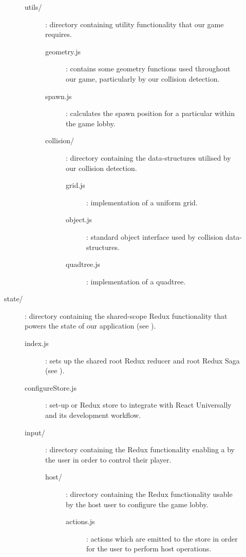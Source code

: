 \documentclass{standalone}
\begin{document}
\begin{formal}
\begin{description}
\begin{description}
\begin{description}
			      		\item[utils/]: directory containing utility functionality that our game requires.
				      	\begin{description}
			      			\item[geometry.js]: contains some geometry functions used throughout our game, particularly by our collision detection.
			      			\item[spawn.js]: calculates the spawn position for a particular within the game lobby.

			      			\item[collision/]: directory containing the data-structures utilised by our collision detection.
				      		\begin{description}
				      			\item[grid.js]: implementation of a uniform grid.
				      			\item[object.js]: standard object interface used by collision data-structures.
				      			\item[quadtree.js]: implementation of a quadtree.
				    			\end{description}
			      		\end{description}
					    \end{description}

					    \item[state/]: directory containing the shared-scope Redux functionality that powers the state of our application (see ).
					    	\begin{description}
			      			\item[index.js]: sets up the shared root Redux reducer and root Redux Saga (see ).
			      			\item[configureStore.js]: set-up or Redux store to integrate with React Universally and its development workflow.

			      			\item[input/]: directory containing the Redux functionality enabling a by the user in order to control their player.
					    		\begin{description}
				      			\item[host/]: directory containing the Redux functionality usable by the host user to configure the game lobby.
						    		\begin{description}
				      				\item[actions.js]: actions which are emitted to the store in order for the user to perform host operations.
			    					\end{description}


\end{description}
\end{description}
\end{description}
\end{description}
\end{formal}
\end{document}
